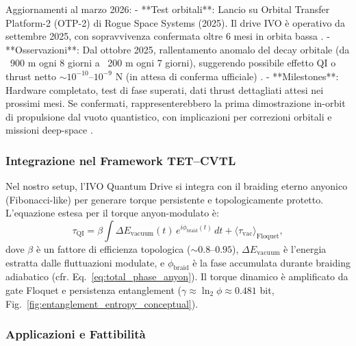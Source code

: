 \documentclass[11pt,a4paper]{article}
\let\oldcite\cite
\renewcommand{\cite}{\protect\oldcite}
\let\oldref\ref
\renewcommand{\ref}{\protect\oldref}
\theoremstyle{plain}
\theoremstyle{definition}
\begin{document}
Aggiornamenti al marzo 2026:
- **Test orbitali**: Lancio su Orbital Transfer Platform-2 (OTP-2) di Rogue Space Systems (2025). Il drive IVO è operativo da settembre 2025, con sopravvivenza confermata oltre 6 mesi in orbita bassa \cite{nextbigfuture2025operational, spacefed2026ivo}.
- **Osservazioni**: Dal ottobre 2025, rallentamento anomalo del decay orbitale (da ~900 m ogni 8 giorni a ~200 m ogni 7 giorni), suggerendo possibile effetto QI o thrust netto $\sim 10^{-10}$–$10^{-9}$ N (in attesa di conferma ufficiale) \cite{nextbigfuture2025slowing}.
- **Milestones**: Hardware completato, test di fase superati, dati thrust dettagliati attesi nei prossimi mesi. Se confermati, rappresenterebbero la prima dimostrazione in-orbit di propulsione dal vuoto quantistico, con implicazioni per correzioni orbitali e missioni deep-space \cite{spacefed2026ivo}.



\vspace{0.3cm}

\subsubsection{Integrazione nel Framework TET--CVTL}

Nel nostro setup, l'IVO Quantum Drive si integra con il braiding eterno anyonico (Fibonacci-like) per generare torque persistente e topologicamente protetto. L'equazione estesa per il torque anyon-modulato è:
\begin{equation}
\tau_{\mathrm{QI}} = \beta \int \Delta E_{\mathrm{vacuum}}(t) \, e^{i \phi_{\mathrm{braid}}(t)} \, dt + \langle \tau_{\mathrm{vac}} \rangle_{\mathrm{Floquet}},
\label{eq:qi_torque_extended}
\end{equation}
dove $\beta$ è un fattore di efficienza topologica ($\sim 0.8$--$0.95$), $\Delta E_{\mathrm{vacuum}}$ è l'energia estratta dalle fluttuazioni modulate, e $\phi_{\mathrm{braid}}$ è la fase accumulata durante braiding adiabatico (cfr. Eq.~\eqref{eq:total_phase_anyon}). Il torque dinamico è amplificato da gate Floquet e persistenza entanglement ($\gamma \approx \ln_2 \phi \approx 0.481$ bit, Fig.~\ref{fig:entanglement_entropy_conceptual}).

\vspace{0.3cm}

\subsubsection{Applicazioni e Fattibilità}
\end{document}
